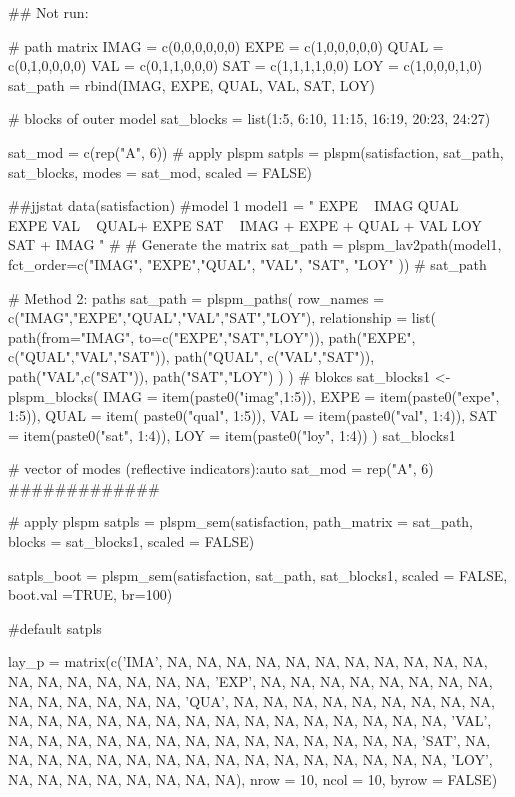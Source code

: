 \documentclass[a4paper]{book}
\begin{document}
%
\begin{Examples}
\begin{ExampleCode}
\#\# Not run: 

# path matrix
IMAG = c(0,0,0,0,0,0)
EXPE = c(1,0,0,0,0,0)
QUAL = c(0,1,0,0,0,0)
VAL = c(0,1,1,0,0,0)
SAT = c(1,1,1,1,0,0)
LOY = c(1,0,0,0,1,0)
sat_path = rbind(IMAG, EXPE, QUAL, VAL, SAT, LOY)

# blocks of outer model
sat_blocks = list(1:5, 6:10, 11:15, 16:19, 20:23, 24:27)

sat_mod = c(rep("A", 6))
# apply plspm
satpls = plspm(satisfaction, sat_path, sat_blocks, modes = sat_mod,
               scaled = FALSE)


 ##jjstat
data(satisfaction)
#model 1
model1 = "
EXPE ~ IMAG
QUAL ~ EXPE
VAL ~  QUAL+ EXPE
SAT ~ IMAG + EXPE + QUAL + VAL
LOY ~ SAT + IMAG
"
# # Generate the matrix
sat_path = plspm_lav2path(model1,
                          fct_order=c("IMAG", "EXPE","QUAL", "VAL", "SAT", "LOY" ))
# sat_path

# Method 2: paths
sat_path = plspm_paths(
  row_names = c("IMAG","EXPE","QUAL","VAL","SAT","LOY"),
  relationship = list(
    path(from="IMAG", to=c("EXPE","SAT","LOY")),
    path("EXPE", c("QUAL","VAL","SAT")),
    path("QUAL", c("VAL","SAT")),
    path("VAL",c("SAT")),
    path("SAT","LOY")
  )
)
# blokcs
sat_blocks1 <- plspm_blocks(
  IMAG = item(paste0("imag",1:5)),
  EXPE = item(paste0("expe", 1:5)),
  QUAL = item( paste0("qual", 1:5)),
  VAL = item(paste0("val", 1:4)),
  SAT = item(paste0("sat", 1:4)),
  LOY = item(paste0("loy", 1:4))
)
sat_blocks1

# vector of modes (reflective indicators):auto
sat_mod = rep("A", 6)
#############

# apply plspm
satpls = plspm_sem(satisfaction,
                   path_matrix = sat_path,
                   blocks = sat_blocks1,
                   scaled = FALSE)

satpls_boot = plspm_sem(satisfaction, sat_path, sat_blocks1, scaled = FALSE,
                        boot.val =TRUE, br=100)

#default
satpls %



lay_p = matrix(c('IMA', NA, NA, NA, NA, NA, NA,
 NA, NA, NA, NA, NA, NA, NA, NA, NA, NA, NA, NA,
 'EXP', NA, NA, NA, NA, NA, NA, NA, NA, NA, NA,
 NA, NA, NA, NA, 'QUA', NA, NA, NA, NA, NA, NA,
 NA, NA, NA, NA, NA, NA, NA, NA, NA, NA, NA, NA,
 NA, NA, NA, NA, NA, NA, 'VAL', NA, NA, NA, NA,
 NA, NA, NA, NA, NA, NA, NA, NA, NA, NA, 'SAT',
 NA, NA, NA, NA, NA, NA, NA, NA, NA, NA, NA, NA,
 NA, NA, NA, NA, 'LOY', NA, NA, NA, NA, NA, NA, NA, NA),
 nrow = 10, ncol = 10, byrow = FALSE)


\end{ExampleCode}
\end{Examples}
\end{document}

